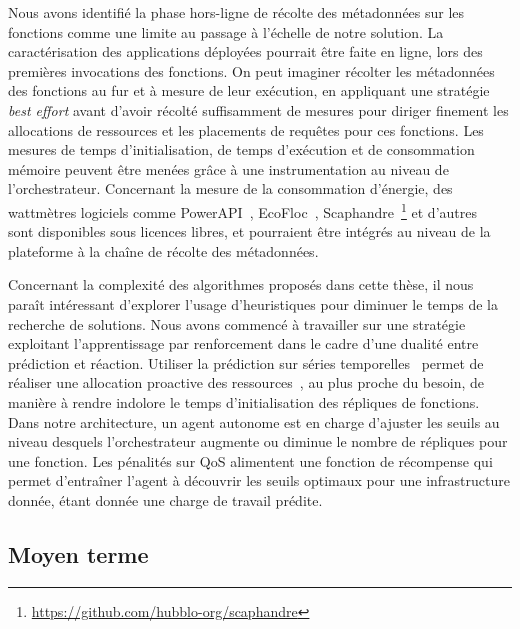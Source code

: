 Nous avons identifié la phase hors-ligne de récolte des métadonnées sur les fonctions comme une limite au passage à l'échelle de notre solution. La caractérisation des applications déployées pourrait être faite en ligne, lors des premières invocations des fonctions. On peut imaginer récolter les métadonnées des fonctions au fur et à mesure de leur exécution, en appliquant une stratégie \textit{best effort} avant d'avoir récolté suffisamment de mesures pour diriger finement les allocations de ressources et les placements de requêtes pour ces fonctions. Les mesures de temps d'initialisation, de temps d'exécution et de consommation mémoire peuvent être menées grâce à une instrumentation au niveau de l'orchestrateur. Concernant la mesure de la consommation d'énergie, des wattmètres logiciels comme PowerAPI~\cite{fieniPowerAPIPythonFramework2024}, EcoFloc~\cite{valeraEnergySavingPerspective}, Scaphandre~\footnote{\href{https://github.com/hubblo-org/scaphandre}{https://github.com/hubblo-org/scaphandre}} et d'autres~\cite{jayExperimentalComparisonSoftwarebased2023} sont disponibles sous licences libres, et pourraient être intégrés au niveau de la plateforme à la chaîne de récolte des métadonnées.

Concernant la complexité des algorithmes proposés dans cette thèse, il nous paraît intéressant d'explorer l'usage d'heuristiques pour diminuer le temps de la recherche de solutions. Nous avons commencé à travailler sur une stratégie exploitant l'apprentissage par renforcement dans le cadre d'une dualité entre prédiction et réaction. Utiliser la prédiction sur séries temporelles~\cite{bauerTimeSeriesForecasting2020} permet de réaliser une allocation proactive des ressources~\cite{parkGraphNeuralNetworkBased2024, handaouiReLeaSERReinforcementLearning2020}, au plus proche du besoin, de manière à rendre indolore le temps d'initialisation des répliques de fonctions. Dans notre architecture, un agent autonome est en charge d'ajuster les seuils au niveau desquels l'orchestrateur augmente ou diminue le nombre de répliques pour une fonction. Les pénalités sur \gls{QoS} alimentent une fonction de récompense qui permet d'entraîner l'agent à découvrir les seuils optimaux pour une infrastructure donnée, étant donnée une charge de travail prédite.

\subsection{Moyen terme}

